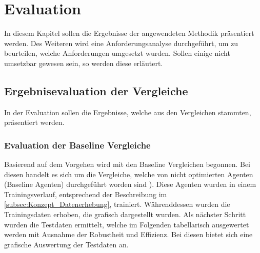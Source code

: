 \chapter{Evaluation} \label{chap:Evaluation}
In diesem Kapitel sollen die Ergebnisse der angewendeten Methodik präsentiert werden. Des Weiteren wird eine Anforderungsanalyse durchgeführt, um zu beurteilen, welche Anforderungen umgesetzt wurden. Sollen einige nicht umsetzbar gewesen sein, so werden diese erläutert.

\section{Ergebnisevaluation der Vergleiche} \label{sec:Evaluation_Ergebnisevaluation}
In der Evaluation sollen die Ergebnisse, welche aus den Vergleichen stammten, präsentiert werden.

\subsection{Evaluation der Baseline Vergleiche}
Basierend auf dem Vorgehen  wird mit den Baseline Vergleichen begonnen. Bei diesen handelt es sich um die Vergleiche, welche von  nicht optimierten Agenten (Baseline Agenten) durchgeführt worden sind ). Diese Agenten wurden in einem Trainingsverlauf, entsprechend der Beschreibung im \autoref{subsec:Konzept_Datenerhebung}, trainiert. 
Währenddessen wurden die Trainingsdaten erhoben, die grafisch dargestellt wurden. 
Als nächster Schritt wurden die Testdaten ermittelt, welche im Folgenden tabellarisch ausgewertet werden mit Ausnahme der Robustheit und Effizienz. Bei diesen bietet sich eine grafische Auswertung der Testdaten an.

